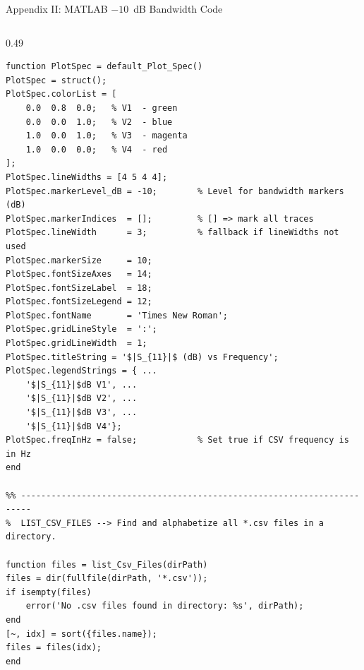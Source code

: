 \documentclass[compress,aspectratio=169,10pt]{beamer}
\begin{document}
\begin{frame}[fragile]{Appendix II: MATLAB $-10$~dB Bandwidth Code}
\begin{columns}[T]
\begin{column}{0.49\textwidth}
\begin{lstlisting}[firstnumber=30]
function PlotSpec = default_Plot_Spec()
PlotSpec = struct();
PlotSpec.colorList = [
    0.0  0.8  0.0;   % V1  - green
    0.0  0.0  1.0;   % V2  - blue
    1.0  0.0  1.0;   % V3  - magenta
    1.0  0.0  0.0;   % V4  - red
];
PlotSpec.lineWidths = [4 5 4 4];
PlotSpec.markerLevel_dB = -10;        % Level for bandwidth markers (dB)
PlotSpec.markerIndices  = [];         % [] => mark all traces
PlotSpec.lineWidth      = 3;          % fallback if lineWidths not used
PlotSpec.markerSize     = 10;
PlotSpec.fontSizeAxes   = 14;
PlotSpec.fontSizeLabel  = 18;
PlotSpec.fontSizeLegend = 12;
PlotSpec.fontName       = 'Times New Roman';
PlotSpec.gridLineStyle  = ':';
PlotSpec.gridLineWidth  = 1;
PlotSpec.titleString = '$|S_{11}|$ (dB) vs Frequency';
PlotSpec.legendStrings = { ...
    '$|S_{11}|$dB V1', ...
    '$|S_{11}|$dB V2', ...
    '$|S_{11}|$dB V3', ...
    '$|S_{11}|$dB V4'};
PlotSpec.freqInHz = false;            % Set true if CSV frequency is in Hz
end

%% ------------------------------------------------------------------------
%  LIST_CSV_FILES --> Find and alphabetize all *.csv files in a directory.

function files = list_Csv_Files(dirPath)
files = dir(fullfile(dirPath, '*.csv'));
if isempty(files)
    error('No .csv files found in directory: %s', dirPath);
end
[~, idx] = sort({files.name});
files = files(idx);
end
            \end{lstlisting}
        \end{column}
    \end{columns}
\end{frame}
\end{document}
